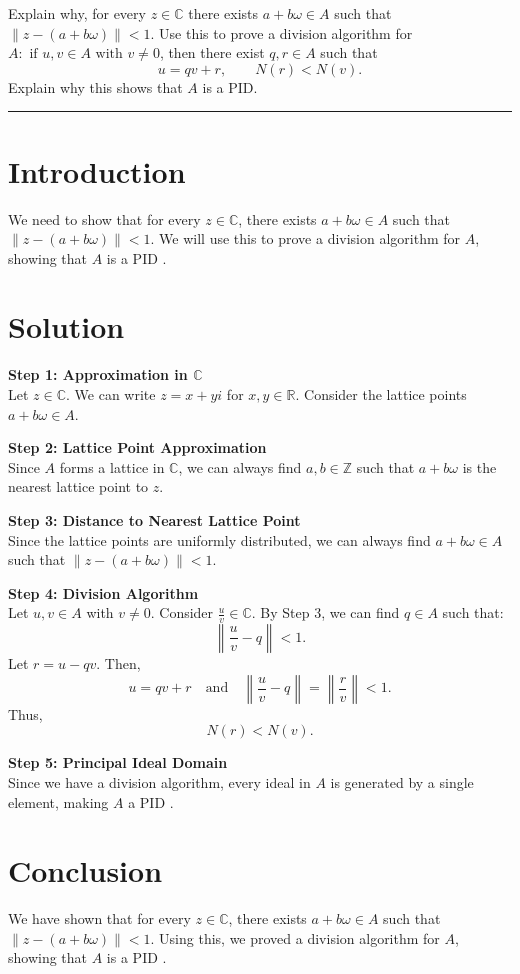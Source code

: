 \documentclass[12pt]{amsart}
\theoremstyle{definition}
\numberwithin{equation}{section}
\newcommand{\Z}{\mathbb{Z}}
\renewcommand{\C}{\mathbb{C}}
\newcommand{\R}{\mathbb{R}}
\begin{document}
\begin{exercise}{10} Explain why, for every \( z \in \C \) there exists \(a +b\omega \in A\) such that \( \| z - (a+b\omega ) \| < 1\). Use this to prove a division algorithm for \(A : \text{ if } u,v \in A \text{ with } v \neq 0 \), then there exist \(q,r \in A\) such that \[ u = qv + r, \qquad N(r) < N(v).\] Explain why this shows that \(A \) is a PID\@.

    \noindent\rule{\linewidth}{1pt}

    \section*{Introduction}
    We need to show that for every \(z \in \C \), there exists \(a + b \omega \in A\) such that \( \| z - (a + b \omega) \| < 1\). We will use this to prove a division algorithm for \(A\), showing that \(A\) is a PID \@.

    \section*{Solution}
    \noindent \textbf{Step 1: Approximation in \(\C \)}\\
    Let \(z \in \C \). We can write \(z = x + yi\) for \(x, y \in \R \). Consider the lattice points \(a + b \omega \in A\).

    \noindent \textbf{Step 2: Lattice Point Approximation}\\
    Since \(A\) forms a lattice in \(\C \), we can always find \(a, b \in \Z \) such that \(a + b \omega \) is the nearest lattice point to \(z\).

    \noindent \textbf{Step 3: Distance to Nearest Lattice Point}\\
    Since the lattice points are uniformly distributed, we can always find \(a + b \omega \in A\) such that \( \| z - (a + b \omega) \| < 1\).

    \noindent \textbf{Step 4: Division Algorithm}\\
    Let \(u, v \in A\) with \(v \neq 0\). Consider \(\frac{u}{v} \in \C \). By Step 3, we can find \(q \in A\) such that:
    \[
    \left \| \frac{u}{v} - q \right \| < 1.
    \]
    Let \(r = u - qv\). Then,
    \[
    u = qv + r \quad \text{and} \quad \left \| \frac{u}{v} - q \right \| = \left \| \frac{r}{v} \right \| < 1.
    \]
    Thus,
    \[
    N(r) < N(v).
    \]

    \noindent \textbf{Step 5: Principal Ideal Domain}\\
    Since we have a division algorithm, every ideal in \(A\) is generated by a single element, making \(A\) a PID \@.

    \section*{Conclusion}
    We have shown that for every \(z \in \C \), there exists \(a + b \omega \in A\) such that \( \| z - (a + b \omega) \| < 1\). Using this, we proved a division algorithm for \(A\), showing that \(A\) is a PID \@.

\end{exercise}
\newpage
\end{document}
